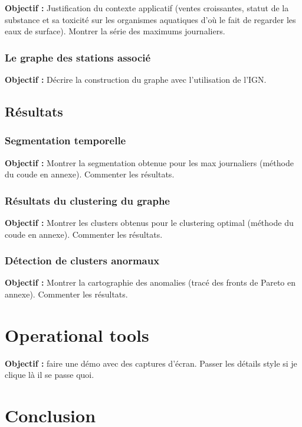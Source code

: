 \documentclass[12pt, twoside]{report}
\begin{document}
\textbf{Objectif :} Justification du contexte applicatif (ventes croissantes, statut de la substance et sa toxicité sur les organismes aquatiques d'où le fait de regarder les eaux de surface). Montrer la série des maximums journaliers.

\subsection{Le graphe des stations associé}

\textbf{Objectif :} Décrire la construction du graphe avec l'utilisation de l'IGN. 

\section{Résultats}

\subsection{Segmentation temporelle}

\textbf{Objectif :} Montrer la segmentation obtenue pour les max journaliers (méthode du coude en annexe). Commenter les résultats.

\subsection{Résultats du clustering du graphe}

\textbf{Objectif :} Montrer les clusters obtenus pour le clustering optimal (méthode du coude en annexe). Commenter les résultats. 

\subsection{Détection de clusters anormaux}

\textbf{Objectif :} Montrer la cartographie des anomalies (tracé des fronts de Pareto en annexe). Commenter les résultats. 

\chapter{Operational tools}

\textbf{Objectif :} faire une démo avec des captures d'écran. Passer les détails style si je clique là il se passe quoi.

\chapter{Conclusion}
\end{document}
